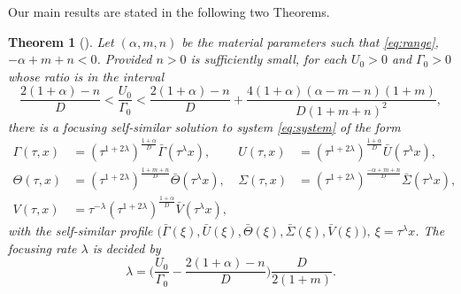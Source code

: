 \documentclass[a4paper,11pt]{article}
\def\bG{{\bar{\Gamma}}}
\def\bV{{\bar{V}}}
\def\bTh{{\bar{\Theta}}}
\def\bS{{\bar{\Sigma}}}
\def\bU{{\bar{U}}}
\newtheorem{theorem}{Theorem}
\theoremstyle{remark}
\begin{document}
Our main results are stated in the following two Theorems.
\begin{theorem}[\cite{KLT17}] \label{mainthm1}
Let $(\alpha, m, n)$ be the material parameters such that \eqref{eq:range}, $-\alpha+m+n<0$. Provided $n>0$ is sufficiently small, for each $U_0>0$ and $\Gamma_0>0$ whose ratio is in the interval
\begin{equation} \label{eq:restriction}
 \frac{2(1+\alpha) -n}{D} < \frac{U _0}{\Gamma _0} < \frac{2(1+\alpha) -n}{D} + \frac{4(1+\alpha)(\alpha-m-n)(1+m)}{D(1+m+n)^2},
\end{equation}
there is a focusing self-similar solution to system \eqref{eq:system} of the form
\begin{align*}
 \Gamma (\tau,x) &= \left(\tau^{1+ 2 \lambda}\right) ^{ \frac{1+ \alpha}{D}} \bG(\tau ^\lambda x), & U (\tau,x) &=\left(\tau^{1+ 2 \lambda}\right) ^{ \frac{1+ \alpha}{D}} \bU( \tau ^\lambda x),\\
 \Theta (\tau,x) &= \left(\tau^{1+ 2 \lambda}\right) ^{ \frac{1+ m +n}{D}} \bTh( \tau ^\lambda x), & \Sigma (\tau,x) &= \left(\tau^{1+ 2 \lambda}\right) ^{ \frac{- \alpha +m+n}{D}} \bS( \tau ^\lambda x),\\
 V (\tau,x) &= \tau ^{-\lambda} \left(\tau^{1+ 2 \lambda}\right) ^{ \frac{1+ \alpha}{D}} \bV( \tau ^\lambda x),
\end{align*}
with the self-similar profile $\big(\bG(\xi), \bU(\xi), \bTh(\xi),\bS(\xi),\bV(\xi)\big), \ \xi = \tau^\lambda x$. The focusing rate $\lambda$ is decided by
\begin{equation} \label{eq:lambda}
 \lambda = \Big(\frac{U _0}{\Gamma _0} - \frac{2(1+\alpha)-n}{D}\Big)\frac{D}{2(1+m)}.
\end{equation}

\end{theorem}
\end{document}
